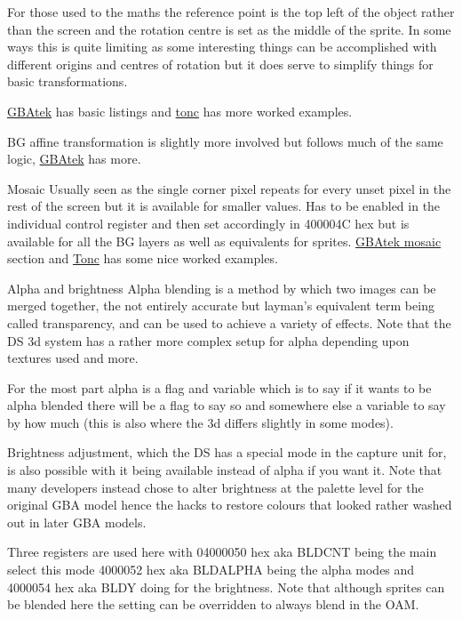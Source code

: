 \documentclass[
]{book}
\begin{document}
For those used to the maths the reference point is the top left of the object rather than the screen and the rotation centre is set as the middle of the sprite. In some ways this is quite limiting as some interesting things can be accomplished with different origins and centres of rotation but it does serve to simplify things for basic transformations.

\href{http://problemkaputt.de/gbatek.htm\#lcdobjoamattributes}{GBAtek} has basic listings and \href{http://www.coranac.com/tonc/text/affobj.htm}{tonc} has more worked examples.

BG affine transformation is slightly more involved but follows much of the same logic, \href{http://problemkaputt.de/gbatek.htm\#lcdiobgrotationscaling}{GBAtek} has more.

Mosaic Usually seen as the single corner pixel repeats for every unset pixel in the rest of the screen but it is available for smaller values. Has to be enabled in the individual control register and then set accordingly in 400004C hex but is available for all the BG layers as well as equivalents for sprites. \href{http://problemkaputt.de/gbatek.htm\#lcdiomosaicfunction}{GBAtek mosaic} section and \href{http://www.coranac.com/tonc/text/gfx.htm\#sec-blend}{Tonc} has some nice worked examples.

Alpha and brightness Alpha blending is a method by which two images can be merged together, the not entirely accurate but layman's equivalent term being called transparency, and can be used to achieve a variety of effects. Note that the DS 3d system has a rather more complex setup for alpha depending upon textures used and more.

For the most part alpha is a flag and variable which is to say if it wants to be alpha blended there will be a flag to say so and somewhere else a variable to say by how much (this is also where the 3d differs slightly in some modes).

Brightness adjustment, which the DS has a special mode in the capture unit for, is also possible with it being available instead of alpha if you want it. Note that many developers instead chose to alter brightness at the palette level for the original GBA model hence the hacks to restore colours that looked rather washed out in later GBA models.

Three registers are used here with 04000050 hex aka BLDCNT being the main select this mode 4000052 hex aka BLDALPHA being the alpha modes and 4000054 hex aka BLDY doing for the brightness. Note that although sprites can be blended here the setting can be overridden to always blend in the OAM.
\end{document}
